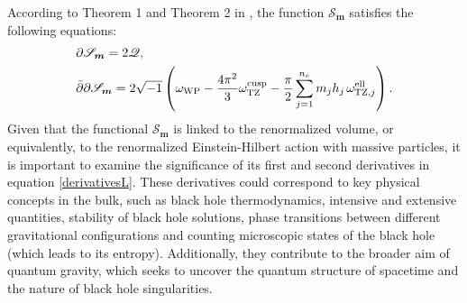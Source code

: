 \documentclass[a4paper,11pt]{article}
\newcommand{\Gpotential}{\mathscr{S}}
\begin{document}
According to Theorem 1 and Theorem 2 in \cite{Taghavi2024classical}, the function $\Gpotential_{\boldsymbol{m}}$ satisfies the following equations:
\begin{equation}
\begin{split}
&\partial \Gpotential_{\boldsymbol{m}} = 2 \mathscr{Q},\\&\bar{\partial} \partial \Gpotential_{\boldsymbol{m}} = 2\sqrt{-1}\left(\omega_{\text{WP}}-\frac{4\pi^2}{3} \omega^{\text{\text{cusp}}}_{\text{TZ}}- \frac{\pi}{2} \sum_{j=1}^{n_e} m_j h_j \hspace{.5mm}\omega^{\text{\text{ell}}}_{\text{TZ},j}\right).\label{derivativesL}
\end{split}
\end{equation}
Given that the functional $\Gpotential_{\boldsymbol{m}}$ is linked to the renormalized volume, or equivalently, to the renormalized Einstein-Hilbert action with massive particles, it is important to examine the significance of its first and second derivatives in equation \eqref{derivativesL}. These derivatives could correspond to key physical concepts in the bulk, such as black hole thermodynamics, intensive and extensive quantities, stability of black hole solutions, phase transitions between different gravitational configurations and counting microscopic states of the black hole (which leads to its entropy). Additionally, they contribute to the broader aim of quantum gravity, which seeks to uncover the quantum structure of spacetime and the nature of black hole singularities.
\end{document}
